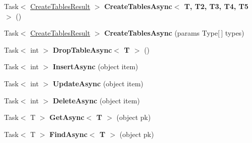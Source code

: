 \begin{DoxyCompactItemize}
\item 
\hypertarget{classSQLite_1_1SQLiteAsyncConnection_a9b3c8584432d04508c89aebbbb1fedea}{Task$<$ \hyperlink{classSQLite_1_1CreateTablesResult}{Create\-Tables\-Result} $>$ {\bfseries Create\-Tables\-Async$<$ T, T2, T3, T4, T5 $>$} ()}\label{classSQLite_1_1SQLiteAsyncConnection_a9b3c8584432d04508c89aebbbb1fedea}

\item 
\hypertarget{classSQLite_1_1SQLiteAsyncConnection_af98ef3fd9628a9cda7b2b0532291f04b}{Task$<$ \hyperlink{classSQLite_1_1CreateTablesResult}{Create\-Tables\-Result} $>$ {\bfseries Create\-Tables\-Async} (params Type\mbox{[}$\,$\mbox{]} types)}\label{classSQLite_1_1SQLiteAsyncConnection_af98ef3fd9628a9cda7b2b0532291f04b}

\item 
\hypertarget{classSQLite_1_1SQLiteAsyncConnection_a6781339fb664cde6494460e686f5cb60}{Task$<$ int $>$ {\bfseries Drop\-Table\-Async$<$ T $>$} ()}\label{classSQLite_1_1SQLiteAsyncConnection_a6781339fb664cde6494460e686f5cb60}

\item 
\hypertarget{classSQLite_1_1SQLiteAsyncConnection_a7c621805c4f3185e9b064288b2b47d4a}{Task$<$ int $>$ {\bfseries Insert\-Async} (object item)}\label{classSQLite_1_1SQLiteAsyncConnection_a7c621805c4f3185e9b064288b2b47d4a}

\item 
\hypertarget{classSQLite_1_1SQLiteAsyncConnection_a3950c4feb7a8d2964a42167d8a4516a0}{Task$<$ int $>$ {\bfseries Update\-Async} (object item)}\label{classSQLite_1_1SQLiteAsyncConnection_a3950c4feb7a8d2964a42167d8a4516a0}

\item 
\hypertarget{classSQLite_1_1SQLiteAsyncConnection_ac34ee6c331f35dc8cbb73a0373315fb0}{Task$<$ int $>$ {\bfseries Delete\-Async} (object item)}\label{classSQLite_1_1SQLiteAsyncConnection_ac34ee6c331f35dc8cbb73a0373315fb0}

\item 
\hypertarget{classSQLite_1_1SQLiteAsyncConnection_a59792569de902bd2e87b967a35154d4c}{Task$<$ T $>$ {\bfseries Get\-Async$<$ T $>$} (object pk)}\label{classSQLite_1_1SQLiteAsyncConnection_a59792569de902bd2e87b967a35154d4c}

\item 
\hypertarget{classSQLite_1_1SQLiteAsyncConnection_a4e09e6aacf646853516ab1befea4ac4b}{Task$<$ T $>$ {\bfseries Find\-Async$<$ T $>$} (object pk)}\label{classSQLite_1_1SQLiteAsyncConnection_a4e09e6aacf646853516ab1befea4ac4b}


\end{DoxyCompactItemize}
